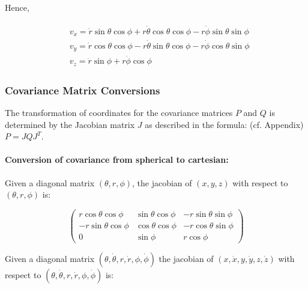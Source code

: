 \documentclass{article}
\newcommand{\rrate}{\dot{r}}
\newcommand{\brate}{\dot{\theta}}
\newcommand{\erate}{\dot{\phi}}
\begin{document}
Hence,


\begin{align}
\begin{split}
{}& v_x= \rrate \sin \theta \cos \phi + r 
\brate \cos \theta \cos \phi - r \erate \sin \theta \sin \phi \\
{}& v_y=\rrate \cos \theta \cos \phi -r \brate \sin \theta \cos \phi - r \erate
\cos \theta \sin \phi
\\
{}& v_z= \rrate \sin \phi + r \erate \cos \phi
\end{split}
\end{align}

\subsubsection{Covariance Matrix Conversions}
The transformation of coordinates for the covariance matrices $P$ and $Q$ is
determined by the Jacobian matrix $J$ as described in the formula: (cf.
Appendix) $P = J Q J^T$.

\paragraph{Conversion of covariance from spherical to cartesian:}
Given a diagonal matrix $(\theta, r, \phi)$, the jacobian of $(x,y,z)$ with
respect to $(\theta, r, \phi)$ is:


\begin{equation}\label{jacobian:position-cartesian}
\begin{pmatrix}
    r \cos \theta \cos \phi &  \sin \theta \cos \phi & -r \sin \theta \sin
    \phi\\
    -r \sin \theta \cos
    \phi & \cos \theta \cos \phi & -r \cos \theta \sin \phi \\
    0 & \sin \phi & r\cos \phi
  \end{pmatrix}
\end{equation}


Given a diagonal matrix $(\theta,\brate, r, \rrate, \phi, \erate)$ the jacobian of
$(x,\dot{x},y,\dot{y},z,\dot{z})$ with respect to $(\theta,\brate, r, \rrate,
\phi, \erate)$ is:
\end{document}
